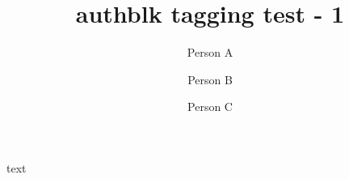 \documentclass{article}
\title{authblk tagging test - 1}
\author{Person A}
\author{Person B}
\affil{Uni 1}
\author{Person C}
\affil{Uni 2}
\begin{document}
\maketitle

text
\end{document}
